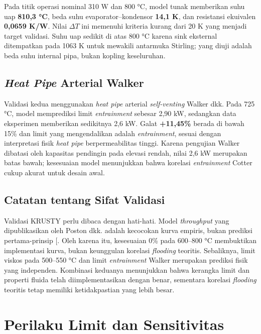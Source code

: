 \documentclass[
  indonesian,
  12pt,
  a4paper,
]{report}
\begin{document}
Pada titik operasi nominal 310 W dan 800 °C, model tunak memberikan suhu
uap \textbf{810,3 °C}, beda suhu evaporator--kondensor \textbf{14,1 K},
dan resistansi ekuivalen \textbf{0,0659 K/W}. Nilai \(\Delta T\) ini
memenuhi kriteria kurang dari 20 K yang menjadi target validasi. Suhu
uap sedikit di atas 800 °C karena sink eksternal ditempatkan pada 1063 K
untuk mewakili antarmuka Stirling; yang diuji adalah beda suhu internal
pipa, bukan kopling keseluruhan.

\subsection{\texorpdfstring{\emph{Heat Pipe} Arterial
Walker}{Heat Pipe Arterial Walker}}\label{heat-pipe-arterial-walker}

Validasi kedua menggunakan \emph{heat pipe} arterial \emph{self-venting}
Walker dkk. Pada 725 °C, model memprediksi limit \emph{entrainment}
sebesar 2,90 kW, sedangkan data eksperimen memberikan sedikitnya 2,6 kW.
Galat \textbf{+11,45\%} berada di bawah 15\% dan limit yang
mengendalikan adalah \emph{entrainment}, sesuai dengan interpretasi
fisik \emph{heat pipe} berpermeabilitas tinggi. Karena pengujian Walker
dibatasi oleh kapasitas pendingin pada elevasi rendah, nilai 2,6 kW
merupakan batas bawah; kesesuaian model menunjukkan bahwa korelasi
\emph{entrainment} Cotter cukup akurat untuk desain awal.

\subsection{Catatan tentang Sifat
Validasi}\label{catatan-tentang-sifat-validasi}

Validasi KRUSTY perlu dibaca dengan hati-hati. Model \emph{throughput}
yang dipublikasikan oleh Poston dkk. adalah kecocokan kurva empiris,
bukan prediksi pertama-prinsip
{[}\citeproc{ref-poston2020results}{5}{]}. Oleh karena itu, kesesuaian
0\% pada 600--800 °C membuktikan implementasi kurva, bukan keunggulan
korelasi \emph{flooding} teoritis. Sebaliknya, limit viskos pada
500--550 °C dan limit \emph{entrainment} Walker merupakan prediksi fisik
yang independen. Kombinasi keduanya menunjukkan bahwa kerangka limit dan
properti fluida telah diimplementasikan dengan benar, sementara korelasi
\emph{flooding} teoritis tetap memiliki ketidakpastian yang lebih besar.

\section{Perilaku Limit dan
Sensitivitas}\label{perilaku-limit-dan-sensitivitas}
\end{document}
